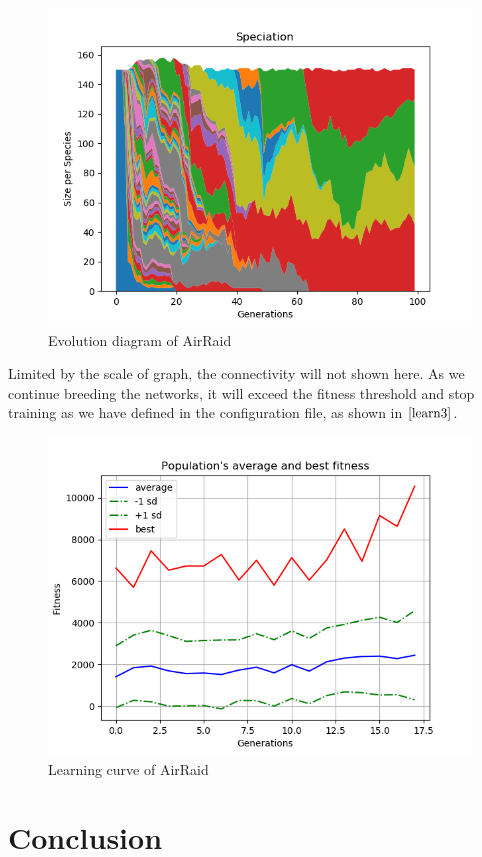 \documentclass{article}
\begin{document}
 \begin{figure}[htbp]
  \centering
  \includegraphics[width = .7\textwidth]{first100species}
  \caption{Evolution diagram of AirRaid}
  \label{evo2}
 \end{figure}
 Limited by the scale of graph, the connectivity will not shown here. As we continue breeding the networks, it will exceed the fitness threshold and stop training as we have defined
 in the configuration file,
 as shown in $\ref{learn3}$.
 \begin{figure}[htbp]
  \centering
  \includegraphics[width = .7\textwidth]{threshold}
  \caption{Learning curve of AirRaid}
  \label{learn3}
 \end{figure}

 


 



\section{Conclusion}
\end{document}
